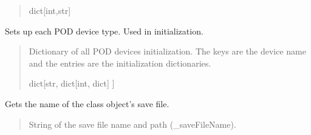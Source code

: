 \documentclass[letterpaper,10pt,english]{sphinxmanual}
\begin{document}
\begin{fulllineitems}
\begin{fulllineitems}
\begin{quote}
\begin{description}
\sphinxAtStartPar
dict{[}int,str{]}

\end{description}\end{quote}

\end{fulllineitems}


\begin{fulllineitems}
\label{\detokenize{Setup_PodDevices:Setup_PodDevices.Setup_PodDevices.GetPODparametersDict}}
\pysigstartsignatures
{}
\pysigstopsignatures
\sphinxAtStartPar
Sets up each POD device type. Used in initialization.
\begin{quote}\begin{description}
\sphinxAtStartPar
Dictionary of all POD devices initialization. The keys are the                 device name and the entries are the initialization dictionaries.

\sphinxAtStartPar
dict{[}str, dict{[}int, dict{]} {]}

\end{description}\end{quote}

\end{fulllineitems}


\begin{fulllineitems}
\label{\detokenize{Setup_PodDevices:Setup_PodDevices.Setup_PodDevices.GetSaveFileName}}
\pysigstartsignatures
{}
\pysigstopsignatures
\sphinxAtStartPar
Gets the name of the class object’s save file.
\begin{quote}\begin{description}
\sphinxAtStartPar
String of the save file name and path (\_saveFileName).


\end{description}
\end{quote}
\end{fulllineitems}
\end{fulllineitems}
\end{document}
